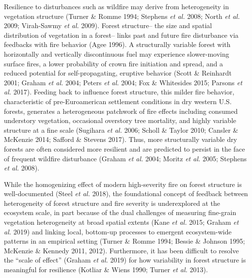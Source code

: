 \documentclass[]{article}
\begin{document}
Resilience to disturbances such as wildfire may derive from
heterogeneity in vegetation structure (Turner \& Romme 1994; Stephens
\emph{et al.} 2008; North \emph{et al.} 2009; Virah-Sawmy \emph{et al.}
2009). Forest structure-- the size and spatial distribution of
vegetation in a forest-- links past and future fire disturbance via
feedbacks with fire behavior (Agee 1996). A structurally variable forest
with horizontally and vertically discontinuous fuel may experience
slower-moving surface fires, a lower probability of crown fire
initiation and spread, and a reduced potential for self-propagating,
eruptive behavior (Scott \& Reinhardt 2001; Graham \emph{et al.} 2004;
Peters \emph{et al.} 2004; Fox \& Whitesides 2015; Parsons \emph{et al.}
2017). Feeding back to influence forest structure, this milder fire
behavior, characteristic of pre-Euroamerican settlement conditions in
dry western U.S. forests, generates a heterogeneous patchwork of fire
effects including consumed understory vegetation, occasional overstory
tree mortality, and highly variable structure at a fine scale (Sugihara
\emph{et al.} 2006; Scholl \& Taylor 2010; Cansler \& McKenzie 2014;
Safford \& Stevens 2017). Thus, more structurally variable dry forests
are often considered more resilient and are predicted to persist in the
face of frequent wildfire disturbance (Graham \emph{et al.} 2004; Moritz
\emph{et al.} 2005; Stephens \emph{et al.} 2008).

While the homogenizing effect of modern high-severity fire on forest
structure is well-documented (Steel \emph{et al.} 2018), the
foundational concept of feedback between heterogeneity of forest
structure and fire severity is underexplored at the ecosystem scale, in
part because of the dual challenges of measuring fine-grain vegetation
heterogeneity at broad spatial extents (Kane \emph{et al.} 2015; Graham
\emph{et al.} 2019) and linking local, bottom-up processes to emergent
ecosystem-wide patterns in an empirical setting (Turner \& Romme 1994;
Bessie \& Johnson 1995; McKenzie \& Kennedy 2011, 2012). Furthermore, it
has been difficult to resolve the ``scale of effect'' (Graham \emph{et
al.} 2019) for how variability in forest structure is meaningful for
resilience (Kotliar \& Wiens 1990; Turner \emph{et al.} 2013).
\end{document}
